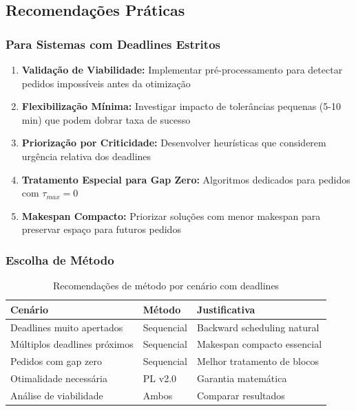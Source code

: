 \documentclass[11pt,a4paper]{article}
\begin{document}
\subsection{Recomendações Práticas}

\subsubsection{Para Sistemas com Deadlines Estritos}

\begin{enumerate}
    \item \textbf{Validação de Viabilidade:} Implementar pré-processamento para detectar pedidos impossíveis antes da otimização

    \item \textbf{Flexibilização Mínima:} Investigar impacto de tolerâncias pequenas (5-10 min) que podem dobrar taxa de sucesso

    \item \textbf{Priorização por Criticidade:} Desenvolver heurísticas que considerem urgência relativa dos deadlines

    \item \textbf{Tratamento Especial para Gap Zero:} Algoritmos dedicados para pedidos com $\tau_{max} = 0$

    \item \textbf{Makespan Compacto:} Priorizar soluções com menor makespan para preservar espaço para futuros pedidos
\end{enumerate}

\subsubsection{Escolha de Método}

\begin{table}[h]
\centering
\begin{tabular}{lll}
\toprule
\textbf{Cenário} & \textbf{Método} & \textbf{Justificativa} \\
\midrule
Deadlines muito apertados & Sequencial & Backward scheduling natural \\
Múltiplos deadlines próximos & Sequencial & Makespan compacto essencial \\
Pedidos com gap zero & Sequencial & Melhor tratamento de blocos \\
Otimalidade necessária & PL v2.0 & Garantia matemática \\
Análise de viabilidade & Ambos & Comparar resultados \\
\bottomrule
\end{tabular}
\caption{Recomendações de método por cenário com deadlines}
\end{table}
\end{document}
